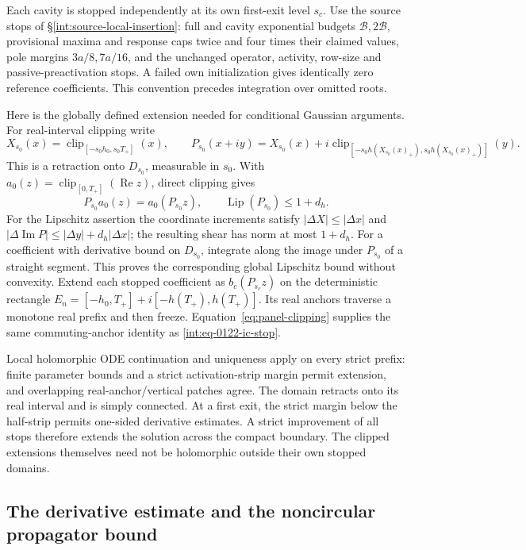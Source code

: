 Each cavity is stopped independently at its own first-exit level
\(s_c\).  Use the source stops of
\S\ref{int:source-local-insertion}: full and cavity exponential budgets
\(\mathcal B,2\mathcal B\), provisional maxima and response caps
twice and four times their claimed values, pole margins \(3a/8,7a/16\),
and the unchanged operator, activity, row-size and passive-preactivation
stops.  A failed own initialization gives identically zero reference
coefficients.  This convention precedes integration over omitted roots.

Here is the globally defined extension needed for conditional Gaussian
arguments.  For real-interval clipping write
\[
 X_{s_0}(x)=\operatorname{clip}_{[-s_0h_0,s_0T_+]}(x),\qquad
 P_{s_0}(x+iy)=X_{s_0}(x)+i\operatorname{clip}_{[-s_0h(X_{s_0}(x)_+),
                  s_0h(X_{s_0}(x)_+)]}(y).
\]
This is a retraction onto \(D_{s_0}\), measurable in \(s_0\).
With \(a_0(z)=\operatorname{clip}_{[0,T_+]}(\operatorname{Re}z)\),
direct clipping gives
\begin{equation}
 P_{s_0}a_0(z)=a_0(P_{s_0}z),\qquad
 \operatorname{Lip}(P_{s_0})\le1+d_h.
 \label{eq:panel-clipping}
\end{equation}
For the Lipschitz assertion the coordinate increments satisfy
\(|\Delta X|\le|\Delta x|\) and
\(|\Delta\operatorname{Im}P|\le|\Delta y|+d_h|\Delta x|\);
the resulting shear has norm at most \(1+d_h\).
For a coefficient with derivative bound on \(D_{s_0}\), integrate
along the image under \(P_{s_0}\) of a straight segment.  This proves
the corresponding global Lipschitz bound without convexity.
Extend each stopped coefficient as \(b_c(P_{s_c}z)\) on the deterministic
rectangle
\(E_n=[-h_0,T_+]+i[-h(T_+),h(T_+)]\).
Its real anchors traverse a monotone real prefix and then freeze.
Equation~\eqref{eq:panel-clipping} supplies the same commuting-anchor
identity as \eqref{int:eq-0122-ic-stop}.

Local holomorphic ODE continuation and uniqueness apply on every strict
prefix: finite parameter bounds and a strict activation-strip margin
permit extension, and overlapping real-anchor/vertical patches agree.
The domain retracts onto its real interval and is simply connected.
At a first exit, the strict margin below the half-strip permits one-sided
derivative estimates.  A strict improvement of all stops therefore
extends the solution across the compact boundary.  The clipped extensions
themselves need not be holomorphic outside their own stopped domains.

\subsection{The derivative estimate and the noncircular propagator bound}
\label{sec:panel-propagator}

